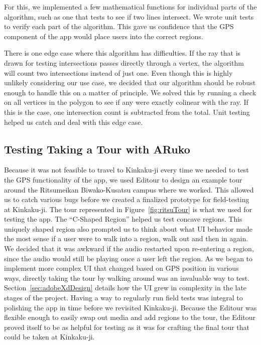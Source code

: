 \documentclass[a4paper, 10pt, american, titlepage]{article}
\begin{document}
For this, we implemented a few mathematical functions for individual parts of
the algorithm, such as one that tests to see if two lines intersect. We wrote
unit tests to verify each part of the algorithm. This gave us confidence that
the GPS component of the app would place users into the correct regions.

There is one edge case where this algorithm has difficulties. If the ray that is
drawn for testing intersections passes directly through a vertex, the algorithm
will count two intersections instead of just one. Even though this is highly
unlikely considering our use case, we decided that our algorithm should be
robust enough to handle this on a matter of principle. We solved this by running
a check on all vertices in the polygon to see if any were exactly colinear with
the ray. If this is the case, one intersection count is subtracted from the
total. Unit testing helped us catch and deal with this edge case.

\subsection{Testing Taking a Tour with ARuko}
\label{sec:testingARuko}

Because it was not feasible to travel to Kinkaku-ji every time we needed to test
the GPS functionality of the app, we used Editour to design an example tour
around the Ritsumeikan Biwako-Kusatsu campus where we worked. This allowed us to
catch various bugs before we created a finalized prototype for field-testing at
Kinkaku-ji. The tour represented in Figure~\ref{fig:ritsuTour} is what we used
for testing the app. The ``C-Shaped Region'' helped us test concave regions.
This uniquely shaped region also prompted us to think about what UI behavior
made the most sense if a user were to walk into a region, walk out and then in
again. We decided that it was awkward if the audio restarted upon re-entering a
region, since the audio would still be playing once a user left the region. As
we began to implement more complex UI that changed based on GPS position in
various ways, directly taking the tour by walking around was an invaluable way
to test. Section~\ref{sec:adobeXdDesign} details how the UI grew in complexity
in the late stages of the project. Having a way to regularly run field tests was
integral to polishing the app in time before we revisited Kinkaku-ji.  Because
the Editour was flexible enough to easily swap out media and add regions to the
tour, the Editour proved itself to be as helpful for testing as it was for
crafting the final tour that could be taken at Kinkaku-ji.
\end{document}
